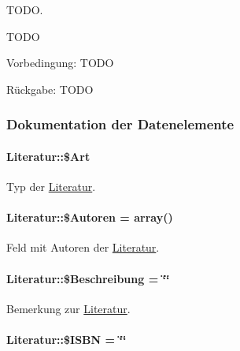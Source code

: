 TODO. 

TODO \begin{Desc}
\item[Vorbedingung:]TODO \end{Desc}
\begin{Desc}
\item[R\"{u}ckgabe:]TODO \end{Desc}


\subsubsection{Dokumentation der Datenelemente}
\hypertarget{classLiteratur_fb4d4b1ce29a33a10e3e27d47f31a447}{
\paragraph[\$Art]{\setlength{\rightskip}{0pt plus 5cm}Literatur::\$Art}\hfill}
\label{classLiteratur_fb4d4b1ce29a33a10e3e27d47f31a447}


Typ der \hyperlink{classLiteratur}{Literatur}. 

\hypertarget{classLiteratur_01b311917d78c1dbb346435598ebba64}{
\paragraph[\$Autoren]{\setlength{\rightskip}{0pt plus 5cm}Literatur::\$Autoren = array()}\hfill}
\label{classLiteratur_01b311917d78c1dbb346435598ebba64}


Feld mit Autoren der \hyperlink{classLiteratur}{Literatur}. 

\hypertarget{classLiteratur_6769ff8b353d2f789125f009b4dcfdc0}{
\paragraph[\$Beschreibung]{\setlength{\rightskip}{0pt plus 5cm}Literatur::\$Beschreibung = \char`\"{}\char`\"{}}\hfill}
\label{classLiteratur_6769ff8b353d2f789125f009b4dcfdc0}


Bemerkung zur \hyperlink{classLiteratur}{Literatur}. 

\hypertarget{classLiteratur_9e3b00766297a68adac423980767dd3c}{
\paragraph[\$ISBN]{\setlength{\rightskip}{0pt plus 5cm}Literatur::\$ISBN = \char`\"{}\char`\"{}}\hfill}
\label{classLiteratur_9e3b00766297a68adac423980767dd3c}


